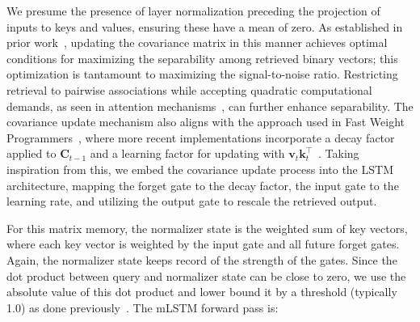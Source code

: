 We presume the presence of layer normalization preceding the projection of inputs to keys and values, ensuring these have a mean of zero. As established in prior work~\citep{Dayan:91}, updating the covariance matrix in this manner achieves optimal conditions for maximizing the separability among retrieved binary vectors; this optimization is tantamount to maximizing the signal-to-noise ratio. Restricting retrieval to pairwise associations while accepting quadratic computational demands, as seen in attention mechanisms~\citep{Krotov:16,Krotov:17,Ramsauer:21}, can further enhance separability. The covariance update mechanism also aligns with the approach used in Fast Weight Programmers~\citep{Schmidhuber:92ncfastweights,Schlag:21}, where more recent implementations incorporate a decay factor applied to $\mathbf{C}_{t-1}$ and a learning factor for updating with 
$\mathbf{v}_{t} \mathbf{k}_t ^\top$~\citep{Ba:16}. Taking inspiration from this, we embed the covariance update process into the LSTM architecture, mapping the forget gate to the decay factor, the input gate to the learning rate, and utilizing the output gate to rescale the retrieved output.

For this matrix memory, the normalizer state is the weighted sum of key vectors, where each key vector is weighted by the input gate and all future forget gates. Again, the normalizer state keeps record of the strength of the gates. Since the dot product between query and normalizer state can be close to zero, we use the absolute value of this dot product and lower bound it by a threshold (typically 1.0) as done previously~\citep{Sun:23arxiv}. The mLSTM forward pass is:

